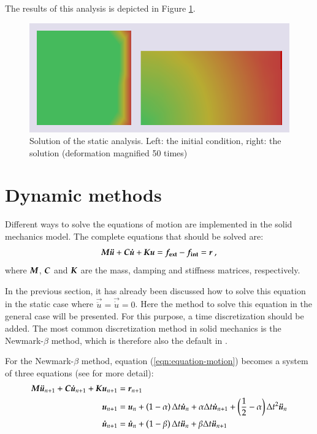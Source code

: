 The results of this analysis is depicted in Figure
\ref{fig:smm:implicit:static_solution}.

\begin{figure}[!htb] 
  \centering
  \includegraphics[width=.6\linewidth]{figures/static_analysis}
  \caption{Solution of the static analysis. Left: the initial
condition, right: the solution (deformation magnified 50 times)}
  \label{fig:smm:implicit:static_solution}
\end{figure}

\section{Dynamic methods} \label{sect:smm:Dynamic_methods}

Different ways to solve the equations of motion are implemented in the
solid mechanics model.  The complete equations that should be solved
are:
\begin{equation}
\label{eqn:equation-motion} 
\boldsymbol{M}\boldsymbol{\ddot{u}} +
\boldsymbol{C}\boldsymbol{\dot{u}} + \boldsymbol{K}\boldsymbol{u} = \boldsymbol{f_{{\mathrm{ext}}}} -
\boldsymbol{f_{{\mathrm{int}}}} = \boldsymbol{r}~,
\end{equation} 
where $\boldsymbol{M}$, $\boldsymbol{C}$ and $\boldsymbol{K}$ are the mass,
damping and stiffness matrices, respectively.

In the previous section, it has already been discussed how to solve
this equation in the static case where $\vec{\ddot{u}} = \vec{\dot{u}}
= 0$.  Here the method to solve this equation in the general case will
be presented.  For this purpose, a time discretization should be
added.  The most common discretization method in solid mechanics is
the Newmark-$\beta$ method, which is therefore also the default in
\akantu.

For the Newmark-$\beta$ method, equation (\ref{eqn:equation-motion})
becomes a system of three equations (see \cite{curnier92a}
\cite{hughes-83a} for more detail):
\begin{align} 
\boldsymbol{M} \boldsymbol{\ddot{u}}_{n+1} + \boldsymbol{C}\boldsymbol{\dot{u}}_{n+1} + \boldsymbol{K} \boldsymbol{u}_{n+1} &=\boldsymbol{r}_{n+1} 
\label{eqn:equation-motion-discret} \\ 
\boldsymbol{u}_{n+1} &=\boldsymbol{u}_{n} + \left(1 - \alpha\right) \Delta t \boldsymbol{\dot{u}}_{n} +
\alpha \Delta t \boldsymbol{\dot{u}}_{n+1} + \left(\frac{1}{2} -
\alpha\right) \Delta t^2
\boldsymbol{\ddot{u}}_{n} \label{eqn:finite-difference-1}\\
\boldsymbol{\dot{u}}_{n+1} &= \boldsymbol{\dot{u}}_{n} + \left(1 - \beta\right)
\Delta t \boldsymbol{\ddot{u}}_{n} + \beta \Delta t
\boldsymbol{\ddot{u}}_{n+1} \label{eqn:finite-difference-2}
\end{align}

